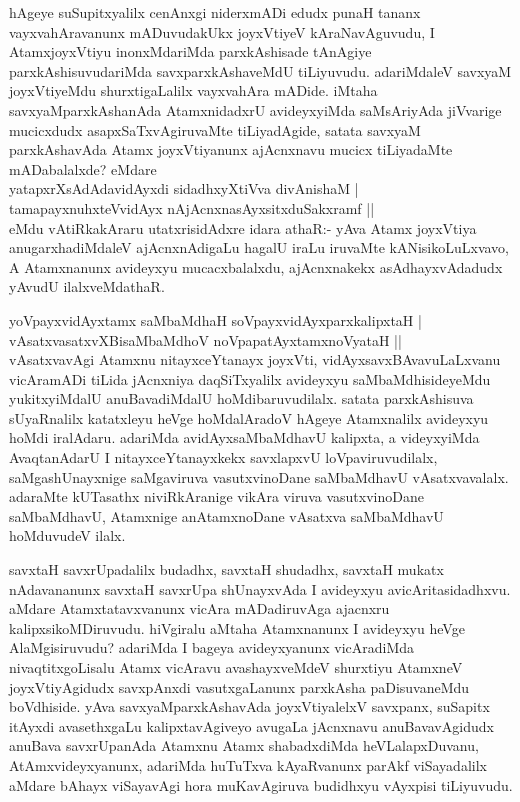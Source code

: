 \begin{artha}
hAgeye suSupitxyalilx cenAnxgi niderxmADi edudx punaH tananx vayxvahAravanunx mADuvudakUkx joyxVtiyeV kAraNavAguvudu, I AtamxjoyxVtiyu inonxMdariMda parxkAshisade tAnAgiye parxkAshisuvudariMda savxparxkAshaveMdU tiLiyuvudu. adariMdaleV savxyaM joyxVtiyeMdu shurxtigaLalilx vayxvahAra mADide. iMtaha savxyaMparxkAshanAda AtamxnidadxrU avideyxyiMda saMsAriyAda jiVvarige mucicxdudx asapxSaTxvAgiruvaMte tiLiyadAgide, satata savxyaM parxkAshavAda Atamx joyxVtiyanunx ajAcnxnavu mucicx tiLiyadaMte mADabalalxde? eMdare \\yatapxrXsAdAdavidAyxdi sidadhxyXtiVva divAnishaM | \\
tamapayxnuhxteV\s vidAyx nAjAcnxnasAyxsitxduSakxramf || \\
eMdu vAtiRkakAraru utatxrisidAdxre idara athaR:- yAva Atamx joyxVtiya anugarxhadiMdaleV ajAcnxnAdigaLu hagalU iraLu iruvaMte kANisikoLuLxvavo, A Atamxnanunx avideyxyu mucacxbalalxdu, ajAcnxnakekx asAdhayxvAdadudx yAvudU ilalxveMdathaR.
\end{artha}


\begin{artha}
yoV\s payxvidAyxtamx saMbaMdhaH soV\s payxvidAyxparxkalipxtaH |\\
vAsatxvasatxvXBisaMbaMdhoV noVpapatAyxtamxnoVyataH ||\\
vAsatxvavAgi Atamxnu nitayxceYtanayx joyxVti, vidAyxsavxBAvavuLaLxvanu vicAramADi tiLida jAcnxniya daqSiTxyalilx avideyxyu saMbaMdhisideyeMdu yukitxyiMdalU anuBavadiMdalU hoMdibaruvudilalx. satata parxkAshisuva sUyaRnalilx katatxleyu heVge hoMdalAradoV hAgeye Atamxnalilx avideyxyu hoMdi iralAdaru. adariMda avidAyxsaMbaMdhavU kalipxta, a videyxyiMda AvaqtanAdarU I nitayxceYtanayxkekx savxlapxvU loVpaviruvudilalx, saMgashUnayxnige saMgaviruva vasutxvinoDane saMbaMdhavU vAsatxvavalalx. adaraMte kUTasathx niviRkAranige vikAra viruva vasutxvinoDane saMbaMdhavU, Atamxnige anAtamxnoDane vAsatxva saMbaMdhavU hoMduvudeV ilalx.
\end{artha}

\begin{artha}
savxtaH savxrUpadalilx budadhx, savxtaH shudadhx, savxtaH  mukatx nAdavananunx savxtaH savxrUpa shUnayxvAda I avideyxyu avicAritasidadhxvu. aMdare Atamxtatavxvanunx vicAra mADadiruvAga ajacnxru kalipxsikoMDiruvudu. hiVgiralu aMtaha Atamxnanunx I avideyxyu heVge AlaMgisiruvudu? adariMda I bageya avideyxyanunx vicAradiMda nivaqtitxgoLisalu Atamx vicAravu avashayxveMdeV shurxtiyu AtamxneV joyxVtiyAgidudx savxpAnxdi vasutxgaLanunx parxkAsha paDisuvaneMdu boVdhiside. yAva savxyaMparxkAshavAda joyxVtiyalelxV savxpanx, suSapitx itAyxdi avasethxgaLu kalipxtavAgiveyo avugaLa jAcnxnavu anuBavavAgidudx anuBava savxrUpanAda Atamxnu Atamx shabadxdiMda heVLalapxDuvanu, AtAmxvideyxyanunx, adariMda huTuTxva kAyaRvanunx parAkf viSayadalilx aMdare bAhayx viSayavAgi hora muKavAgiruva budidhxyu vAyxpisi tiLiyuvudu.
\end{artha}

